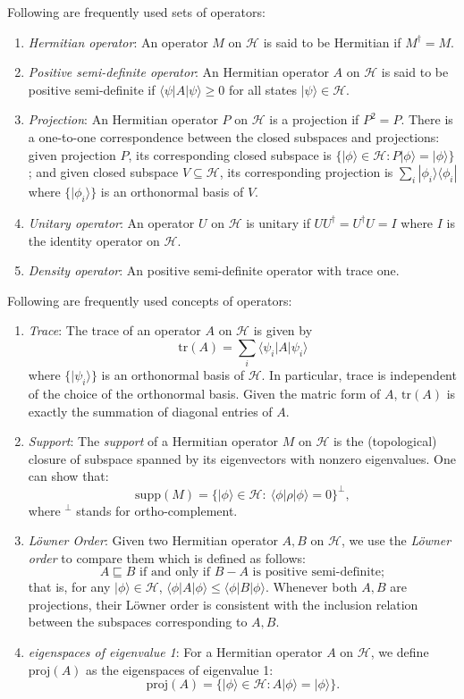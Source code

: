 \documentclass[conference,compsoc, 10pt]{IEEEtran}
\newcommand {\cH } {{\mathcal{H}}}
\newcommand {\tr } {{\mathrm{tr}}}
\newcommand {\supp } {{\mathrm{supp}}}
\def\>{\ensuremath{\rangle}}
\def\<{\ensuremath{\langle}}
\newcommand{\proj}{{\mathrm{proj}}}
\begin{document}
\begin{appendices}
		Following are frequently used sets of operators:
		\begin{enumerate}
			\item \emph{Hermitian operator}: An operator $M$ on
			$\mathcal{H}$ is said to be Hermitian if $M^{\dag}=M$.
			\item \emph{Positive semi-definite operator}: An Hermitian operator $A$ on $\mathcal{H}$ is said to be positive semi-definite if $\langle
			\psi|A|\psi\rangle\geq 0$ for all states $|\psi\rangle\in
			\mathcal{H}$. 
			\item \emph{Projection}: An Hermitian operator $P$ on
			$\mathcal{H}$ is a projection if $P^2 = P$. There is a one-to-one correspondence between the closed subspaces and projections: given projection $P$, its corresponding closed subspace is $\{|\phi\>\in\cH: P|\phi\> = |\phi\>\}$; and given closed subspace $V\subseteq\cH$, its corresponding projection is $\sum_i|\phi_i\>\<\phi_i|$ where $\{|\phi_i\>\}$ is an orthonormal basis of $V$.
			\item \emph{Unitary operator}: An operator $U$ on $\mathcal{H}$ is unitary if $UU^\dag = U^\dag U = I$ where $I$ is the identity operator on $\mathcal{H}$.
			\item \emph{Density operator}: An positive semi-definite operator with trace one.
		\end{enumerate}
		
		Following are frequently used concepts of operators:
		\begin{enumerate}
			\item \emph{Trace}: The trace of an operator $A$ on $\mathcal{H}$ is given by $$\tr(A)=\sum_{i}\langle \psi_i|A|\psi_i\rangle$$
			where $\{|\psi_i\>\}$ is an orthonormal basis of $\mathcal{H}$. In particular, trace is independent of the choice of the orthonormal basis. Given the matric form of $A$, $\tr(A)$ is exactly the summation of diagonal entries of $A$.
			\item \emph{Support}: The \emph{support} of a Hermitian operator $M$ on $\mathcal{H}$ is the (topological) closure of subspace spanned by its eigenvectors with nonzero eigenvalues. One can show that:
			$$\supp(M) = \{|\phi\>\in\cH:\ \<\phi|\rho|\phi\> = 0\}^\bot,$$
			where ${}^\bot$ stands for ortho-complement.
			\item \emph{L\"owner Order}: Given two Hermitian operator $A,B$ on $\mathcal{H}$, we use the \emph{L\"owner order} to compare them which is defined as follows: 
			$$A\sqsubseteq B \text{ if and only if } B-A \text{ is positive semi-definite};$$
			that is, for any $|\phi\>\in\cH$, $\<\phi|A|\phi\> \le \<\phi|B|\phi\>$. Whenever both $A,B$ are projections, their L\"owner order is consistent with the inclusion relation between the subspaces corresponding to $A,B$.
			\item \emph{eigenspaces of eigenvalue 1}: For a Hermitian operator $A$ on $\mathcal{H}$, we define $\proj (A)$ as the eigenspaces of eigenvalue 1:
			$$\proj(A) = \{|\phi\>\in\cH: A|\phi\> = |\phi\>\}.$$
		\end{enumerate}
		

\end{appendices}
\end{document}
